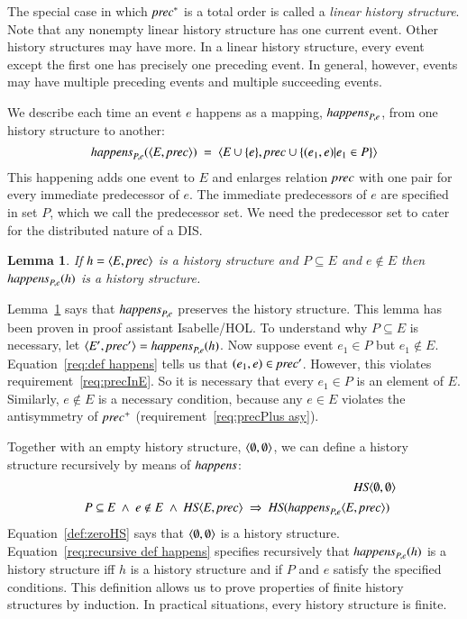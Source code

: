 \documentclass{elsarticle}
\newtheorem{lemma}{Lemma}
\def\id#1{\text{\em #1\/}}
\def\Events{{\mathit E}}
\begin{document}
	The special case in which $\id{prec}^*$ is a total order is called a {\em linear history structure}.
	Note that any nonempty linear history structure has one current event.
	Other history structures may have more.
	In a linear history structure, every event except the first one has precisely one preceding event.
	In general, however, events may have multiple preceding events and multiple succeeding events.

	We describe each time an event $e$ happens as a mapping, $\id{happens}_{P,e}$, from one history structure to another:
\begin{equation}
	\id{happens}_{P,e}(\la \Events, \id{prec}\ra)\ =\ \la \Events\cup\{e\}, \id{prec}\cup\{(e_1,e) | e_1\in P\}\ra
\label{req:def happens}
\end{equation}
	This happening adds one event to $\Events$ and enlarges relation $\id{prec}$ with one pair for every immediate predecessor of $e$.
	The immediate predecessors of $e$ are specified in set $P$, which we call the predecessor set.
	We need the predecessor set to cater for the distributed nature of a DIS.

\begin{lemma}
\label{lemma:happens preserves history structure}
	If $h=\la \Events, \id{prec}\ra$ is a history structure and $P\subseteq\Events$ and $e\notin\Events$
	then $\id{happens}_{P,e}(h)$ is a history structure.
\end{lemma}
	Lemma~\ref{lemma:happens preserves history structure} says that $\id{happens}_{P,e}$ preserves the history structure.
	This lemma has been proven in proof assistant Isabelle/HOL.
	To understand why $P\subseteq\Events$ is necessary,
	let $\la \Events', \id{prec}'\ra=\id{happens}_{P,e}(h)$.
	Now suppose event $e_1\in P$ but $e_1\notin\Events$.
	Equation~\ref{req:def happens} tells us that $(e_1,e)\in\id{prec}'$.
	However, this violates requirement~\ref{req:precInE}.
	So it is necessary that every $e_1\in P$ is an element of $\Events$.
	Similarly, $e\notin\Events$ is a necessary condition,
	because any $e\in\Events$ violates the antisymmetry of $\id{prec}^+$ (requirement~\ref{req:precPlus asy}).

	Together with an empty history structure, $\langle \emptyset, \emptyset\rangle$,
	we can define a history structure recursively by means of $\id{happens}$:
\begin{eqnarray}
	&&\id{HS}\la \emptyset, \emptyset\ra\label{def:zeroHS}\\
&&\begin{array}{@{}l}
	P\subseteq\Events\ \wedge\ e\notin E\ \wedge\ \id{HS}\la \Events, \id{prec}\ra\ \Rightarrow\ \id{HS}(\id{happens}_{P,e}\la \Events, \id{prec}\ra)
\end{array}
\label{req:recursive def happens}
\end{eqnarray}
	Equation~\ref{def:zeroHS} says that $\langle \emptyset, \emptyset\rangle$ is a history structure.
	Equation~\ref{req:recursive def happens} specifies recursively that $\id{happens}_{P,e}(h)$ is a history structure iff
	$h$ is a history structure and if $P$ and $e$ satisfy the specified conditions.
	This definition allows us to prove properties of finite history structures by induction.
	In practical situations, every history structure is finite.
\end{document}
